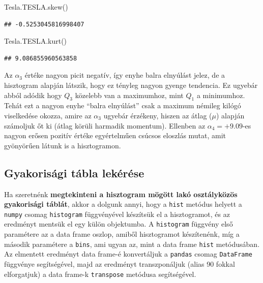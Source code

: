 \documentclass[
]{book}
\newenvironment{Shaded}{\begin{snugshade}}{\end{snugshade}}
\newcommand{\NormalTok}[1]{#1}
\begin{document}
\begin{Shaded}
\begin{Highlighting}[]
\NormalTok{Tesla.TESLA.skew()}
\end{Highlighting}
\end{Shaded}

\begin{verbatim}
## -0.5253045816998407
\end{verbatim}

\begin{Shaded}
\begin{Highlighting}[]
\NormalTok{Tesla.TESLA.kurt()}
\end{Highlighting}
\end{Shaded}

\begin{verbatim}
## 9.086855960563858
\end{verbatim}

Az \(\alpha_3\) értéke nagyon picit negatív, így enyhe balra elnyúlást jelez, de a hisztogram alapján látszik, hogy ez tényleg nagyon gyenge tendencia. Ez ugyebár abból adódik hogy \(Q_3\) közelebb van a maximumhoz, mint \(Q_1\) a minimumhoz. Tehát ezt a nagyon enyhe ``balra elnyúlást'' csak a maximum némileg kilógó viselkedése okozza, amire az \(\alpha_3\) ugyebár érzékeny, hiszen az átlag (\(\mu\)) alapján számoljuk őt ki (átlag körüli harmadik momentum).
Ellenben az \(\alpha_4=+9.09\)-es nagyon erősen pozitív értéke egyértelműen csúcsos eloszlás mutat, amit gyönyörűen látunk is a hisztogramon.

\subsection{Gyakorisági tábla lekérése}\label{gyakorisuxe1gi-tuxe1bla-lekuxe9ruxe9se}

Ha szeretnénk \textbf{megtekinteni a hisztogram mögött lakó osztályközös gyakorisági táblát}, akkor a dolgunk annyi, hogy a \texttt{hist} metódus helyett a \texttt{numpy} csomag \texttt{histogram} függvényével készítsük el a hisztogramot, és az eredményt mentsük el egy külön objektumba. A \texttt{histogram} függvény első paramétere az a data frame oszlop, amiből hisztogramot készítenénk, míg a második paramétere a \texttt{bins}, ami ugyan az, mint a data frame \texttt{hist} metódusában. Az elmentett eredményt data frame-é konvertáljuk a \texttt{pandas} csomag \texttt{DataFrame} függvénye segítségével, majd az eredményt transzponáljuk (alias 90 fokkal elforgatjuk) a data frame-k \texttt{transpose} metódusa segítségével.
\end{document}
